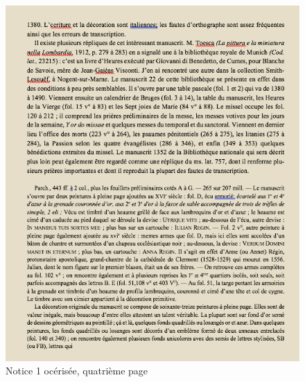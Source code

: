 \documentclass[a4paper,12pt,twoside]{book}
\begin{document}
    \begin{figure}[!h]
    \centering
    \includegraphics[width=15cm]{img/Notices_Leroquais/Notice1/OCR/notice_OCR_1_4.png}
    \caption{Notice 1 océrisée, quatrième page}
    \end{figure}
    \clearpage
    
\end{document}
